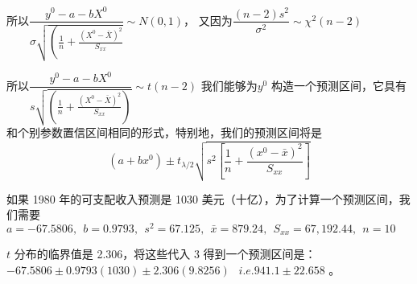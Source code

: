 所以$\dfrac{y^{0}-a-b X^{0}}{\sigma \sqrt{\left(\frac{1}{n}+\frac{\left(X^{0}-\bar{X}\right)^{2}}{S_{x x}}\right.}} \sim N(0,1)$，
又因为$\dfrac{(n-2) s^{2}}{\sigma^{2}} \sim \chi^{2}(n-2)$

所以$\dfrac{y^{0}-a-b X^{0}}{s \sqrt{\left(\frac{1}{n}+\frac{\left(X^{0}-\bar{X}\right)^{2}}{S_{x x}}\right)}} \sim t(n-2)$
\vspace{0.5em}
我们能够为$ y^{ 0 } $ 构造一个预测区间，它具有和个别参数置信区间相同的形式，特别地，我们的预测区间将是
\begin{equation}
    \left(a+b x^{0}\right) \pm t_{\lambda / 2} \sqrt{s^{2}\left[\frac{1}{n}+\frac{\left(x^{0}-\bar{x}\right)^{2}}{S_{x x}}\right]}
\end{equation}

\begin{myexample}
    如果 1980 年的可支配收入预测是 1030 美元（十亿），为了计算一个预测区间，我们需要
   $ a=-67.5806 ,\ \
    b=0.9793 ,\ \
    s^{2}=67.125 ,\ \
    \bar{x}=879.24 ,\ \
    S_{x x}=67,192.44 ,\ \
    n=10 $

    $ t $ 分布的临界值是 2.306，将这些代入 3 得到一个预测区间是：
    $-67.5806 \pm  0.9793(1030) \pm  2.306(9.8256) $
    $\ \  i.e. 941.1 \pm 22.658 $ 。
\end{myexample}